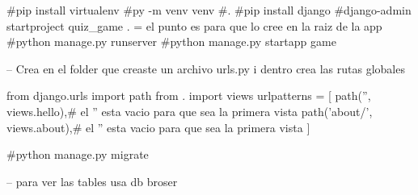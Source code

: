 #pip install virtualenv
#py -m venv venv
#.\venv\Scripts\Activate
#pip install django
#django-admin startproject quiz_game . = el punto es para que lo cree en la raiz de la app
#python manage.py runserver
#python manage.py startapp game

-- Crea en el folder que creaste un archivo urls.py i dentro crea las rutas globales 

from django.urls import path
from . import views
urlpatterns = [
    path('', views.hello),# el  '' esta vacio para que sea la primera vista 
    path('about/', views.about),# el  '' esta vacio para que sea la primera vista 
]

#python manage.py migrate

-- para ver las tables usa db broser 
